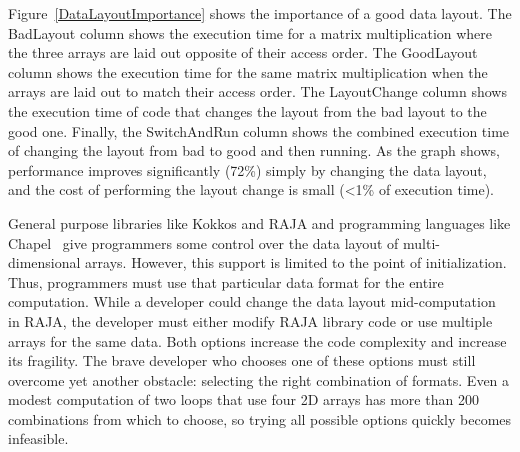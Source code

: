 \documentclass{article}
\begin{document}
Figure~\ref{DataLayoutImportance} shows the importance of a good data layout. 
The BadLayout column shows the execution time for a matrix multiplication where the three arrays are laid out opposite of their access order. 
The GoodLayout column shows the execution time for the same matrix multiplication when the arrays are laid out to match their access order.
The LayoutChange column shows the execution time of code that changes the layout from the bad layout to the good one.
Finally, the SwitchAndRun column shows the combined execution time of changing the layout from bad to good and then running.
As the graph shows, performance improves  significantly (72\%) simply by changing the data layout, and the cost of performing the layout change is small (<1\% of execution time). 

General purpose libraries like Kokkos and RAJA and programming languages like Chapel~\cite{diaconescu2007approach} give programmers some control over the data layout of multi-dimensional arrays. However, this support is limited to the point of initialization.
Thus, programmers must use that particular data format for the entire computation.
While a developer could change the data layout mid-computation in RAJA, the developer must either modify RAJA library code or use multiple arrays for the same data. 
Both options increase the code complexity and increase its fragility.
The brave developer who chooses one of these options must still overcome yet another obstacle: selecting the right combination of formats.
Even a modest computation of two loops that use four 2D arrays has more than 200 combinations from which to choose, so trying all possible options quickly becomes infeasible. 
\end{document}
